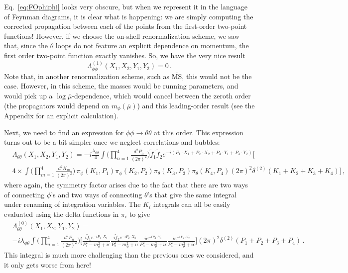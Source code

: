 \documentclass{article}
\newcommand{\td}[1]{\tilde{#1}}
\numberwithin{equation}{subsection}
\begin{document}
Eq.~\eqref{eq:FOphiphi} looks very obscure, but when we represent it in the language of Feynman diagrams, it is clear what is happening: we are simply computing the corrected propagation 
between each of the points from the first-order two-point functions! However, if we choose the on-shell renormalization scheme, we saw that, since the $\theta$ loops do not 
feature an explicit dependence on momentum, the first order two-point function exactly vanishes. So, we have the very nice result
\begin{equation}
    \Lambda_{\phi\phi}^{(1)}(X_1, X_2, Y_1, Y_2) = 0\,.
\end{equation}
Note that, in another renormalization scheme, such as $\overline{\text{MS}}$, this would not be the case. However, in this scheme, the masses would be running parameters, and 
would pick up a $\log\bar{\mu}$-dependence, which would cancel between the zeroth order (the propagators would depend on $m_\phi(\bar{\mu})$) and this
leading-order result (see the Appendix for an explicit calculation). 

Next, we need to find an expression for $\phi\phi\to\theta\theta$ at this order. This expression turns out to be a bit simpler once we neglect correlations and bubbles:
\begin{equation}\begin{split}
    &\Lambda_{\theta\theta}(X_1, X_2, Y_1, Y_2) = -i\frac{\lambda_{\phi\theta}}{4}\int\Bigg(\prod_{n=1}^4\frac{d^2P_n}{(2\pi)^2}\Bigg)\td f_1\td f_2 
	e^{-i(P_1\cdot X_1 +P_2\cdot X_2 + P_3\cdot Y_1 + P_4\cdot Y_2)}\Bigg[\\[0.5em]
    &4\times\int\Bigg(\prod_{m=1}^4\frac{d^2K_m}{(2\pi)^2}\Bigg)\,\pi_\phi(K_1, P_1)\pi_\phi(K_2, P_2)\pi_\theta(K_3, P_3)\pi_\theta(K_4, P_4)(2\pi)^2\delta^{(2)}(K_1 + K_2 + K_3 + K_4)\Bigg]\,,
\end{split}\end{equation}
where again, the symmetry factor arises due to the fact that there are two ways of connecting $\phi$'s and two ways of connecting $\theta$'s that give the same 
integral under renaming of integration variables. The $K_i$ integrals can all be easily evaluated using the delta functions in $\pi_i$ to give
\begin{equation}\begin{split}\label{eq:fourptLam}
    &\Lambda_{\theta\theta}^{(0)}(X_1, X_2, Y_1, Y_2) =\\[0.5em]
    &-i\lambda_{\phi\theta}\int\Bigg(\prod_{n=1}^4\frac{d^2P_n}{(2\pi)^2}\Bigg)\Bigg[\frac{i\td f_1e^{-iP_1\cdot X_1}}{P_1^2 - m_\phi^2 + i\epsilon
	}\frac{i\td f_2e^{-iP_2\cdot X_2}}{P_2^2 - m_\phi^2 + i\epsilon}\frac{ie^{-iP_3\cdot Y_1}}{P_3^2 - m_\theta^2 + i\epsilon}\frac{ie^{-iP_4\cdot Y_2}}{P_4^2 - m_\theta^2 + i\epsilon}\Bigg]
	(2\pi)^2\delta^{(2)}(P_1 + P_2 + P_3 + P_4)\,.
\end{split}\end{equation}
This integral is much more challenging than the previous ones we considered, and it only gets worse from here! 
\end{document}
